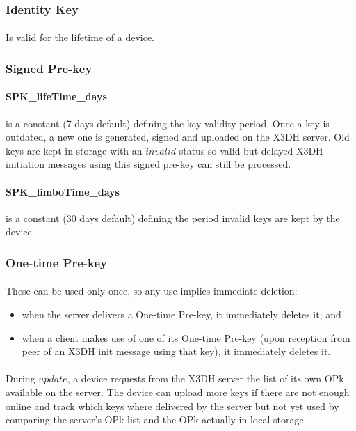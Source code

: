 \documentclass[a4paper,11pt]{article}
\begin{document}
    \subsubsection{Identity Key}
      \paragraph{}Is valid for the lifetime of a device.

    \subsubsection{Signed Pre-key}
      \paragraph*{SPK\_lifeTime\_days}is a constant (7 days default) defining the key validity period. Once a key is outdated, a new one is generated, signed and uploaded on the X3DH server. Old keys are kept in storage with an $invalid$ status so valid but delayed X3DH initiation messages using this signed pre-key can still be processed.
      \paragraph*{SPK\_limboTime\_days}is a constant (30 days default) defining the period invalid keys are kept by the device.

    \subsubsection{One-time Pre-key}
      \paragraph{}These can be used only once, so any use implies immediate deletion:
      \begin{itemize}
      \item when the server delivers a One-time Pre-key, it immediately deletes it; and
      \item when a client makes use of one of its One-time Pre-key (upon reception from peer of an X3DH init message using that key), it immediately deletes it.
      \end{itemize}
      \paragraph*{}During $update$, a device requests from the X3DH server the list of its own OPk available on the server. The device can upload more keys if there are not enough online and track which keys where delivered by the server but not yet used by comparing the server's OPk list and the OPk actually in local storage.
\end{document}
